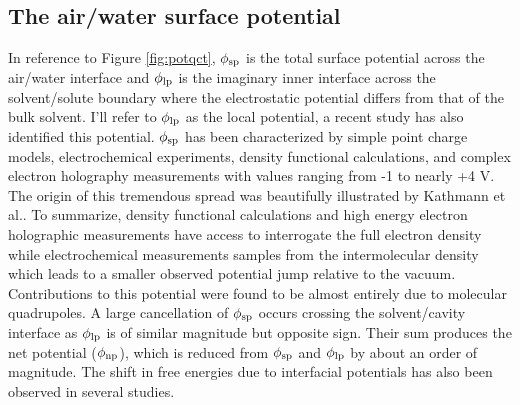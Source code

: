 \begin{intro}
  \subsection{\label{ch1:sec4:level3}The air/water surface potential}
   In reference to Figure \ref{fig:potqct}, $\phi_{\mathrm{sp}}$ is the total surface potential across the air/water interface and $\phi_{\mathrm{lp}}$ is the imaginary inner interface 
   across the solvent/solute boundary where the electrostatic potential differs from that of the bulk solvent. I'll refer to $\phi_{\mathrm{lp}}$ as the local potential, a
   recent study has also identified this potential\cite{remsing2016role}. $\phi_{\mathrm{sp}}$ has been characterized by simple point charge models, electrochemical experiments, 
   density functional calculations, and complex electron holography measurements with values ranging from -1 to nearly +4 V\cite{leung2009sp_mag}. The origin of this tremendous 
   spread was beautifully illustrated by Kathmann et al.\cite{kathmann2011sp}. To summarize, density functional calculations and high energy electron holographic measurements
   have access to interrogate the full electron density while electrochemical measurements samples from the intermolecular density which leads to a smaller observed potential 
   jump relative to the vacuum. Contributions to this potential were found to be almost entirely due to molecular quadrupoles. A large cancellation of $\phi_{\mathrm{sp}}$ occurs 
   crossing the solvent/cavity interface as $\phi_{\mathrm{lp}}$ is of similar magnitude but opposite sign. Their sum produces the net potential ($\phi_{\mathrm{np}}$), which is reduced
   from $\phi_{\mathrm{sp}}$ and $\phi_{\mathrm{lp}}$ by about an order of magnitude\cite{harder2008origin,kathmann2011sp,beck2013sp,remsing2014lp}. The shift in free energies due to interfacial 
   potentials has also been observed in several studies\cite{lamoureux2006absolute,ashbaugh2008lps,beck2013sp}.
   

\end{intro}
